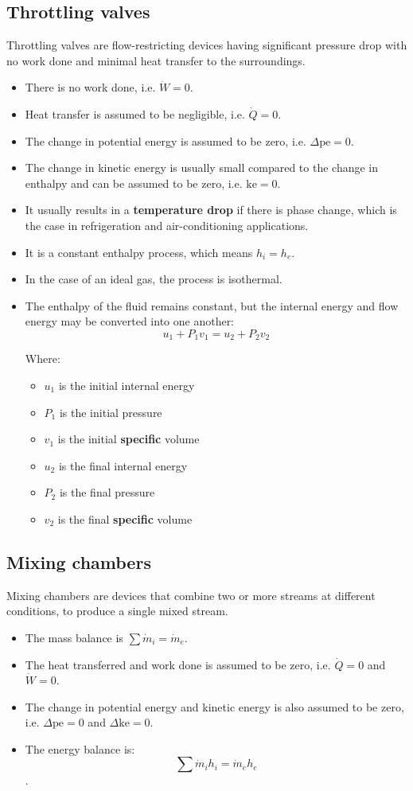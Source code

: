 \documentclass[11pt]{article}
\begin{document}
\subsection{Throttling valves}
\label{sec:org8a9ed53}
Throttling valves are flow-restricting devices having significant pressure drop with no work done and minimal heat transfer to the surroundings.
\begin{itemize}
\item There is no work done, i.e. \(\dot{W} = 0\).
\item Heat transfer is assumed to be negligible, i.e. \(\dot{Q} = 0\).
\item The change in potential energy is assumed to be zero, i.e. \(\Delta \text{pe} = 0\).
\item The change in kinetic energy is usually small compared to the change in enthalpy and can be assumed to be zero, i.e. \(\text{ke} = 0\).
\item It usually results in a \textbf{temperature drop} if there is phase change, which is the case in refrigeration and air-conditioning applications.
\item It is a constant enthalpy process, which means \(h_i = h_e\).
\item In the case of an ideal gas, the process is isothermal.
\item The enthalpy of the fluid remains constant, but the internal energy and flow energy may be converted into one another:
\[u_1 + P_1 v_1 = u_2 + P_2 v_2\]

Where:
\begin{itemize}
\item \(u_1\) is the initial internal energy
\item \(P_1\) is the initial pressure
\item \(v_1\) is the initial \textbf{specific} volume
\item \(u_2\) is the final internal energy
\item \(P_2\) is the final pressure
\item \(v_2\) is the final \textbf{specific} volume
\end{itemize}
\end{itemize}

\newpage
\subsection{Mixing chambers}
\label{sec:orgce7e4a7}
Mixing chambers are devices that combine two or more streams at different conditions, to produce a single mixed stream.
\begin{itemize}
\item The mass balance is \(\sum \dot{m}_i = \dot{m}_e\).
\item The heat transferred and work done is assumed to be zero, i.e. \(\dot{Q} = 0\) and \(\dot{W} = 0\).
\item The change in potential energy and kinetic energy is also assumed to be zero, i.e. \(\Delta \text{pe} = 0\) and \(\Delta \text{ke} = 0\).
\item The energy balance is:
\[\sum \dot{m}_i h_i = \dot{m}_e h_e\].
\end{itemize}
\end{document}
